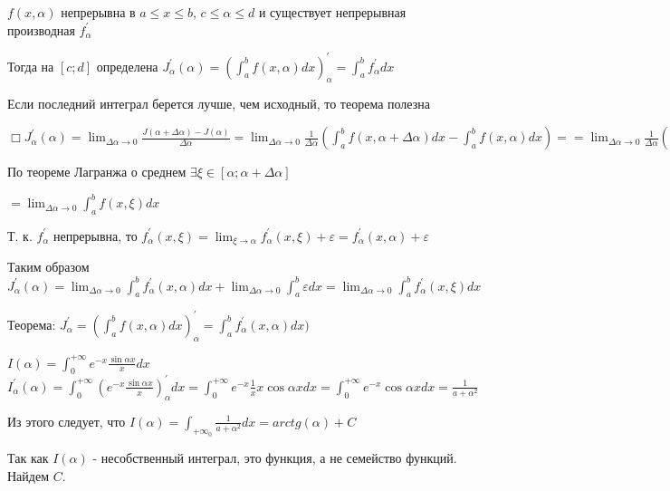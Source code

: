 \documentclass[12pt]{article}
\begin{document}
    $f(x, \alpha)$ непрерывна в $a \leq x \leq b$, $c \leq \alpha \leq d$ и существует непрерывная производная $f^\prime_\alpha$

    Тогда на $[c;d]$ определена $J^\prime_\alpha(\alpha) = \left(\int^b_a f(x, \alpha)dx\right)^\prime_\alpha = \int^b_a f^\prime_\alpha dx$

    Если последний интеграл берется лучше, чем исходный, то теорема полезна

    $\displaystyle \Box J^\prime_\alpha(\alpha) = \lim_{\Delta \alpha \to 0} \frac{J(\alpha + \Delta \alpha) - J(\alpha)}{\Delta \alpha} =
    \lim_{\Delta \alpha \to 0} \frac{1}{\Delta \alpha} \left(\int^b_a f(x, \alpha + \Delta \alpha)dx - \int^b_a f(x, \alpha)dx\right) =
    = \lim_{\Delta \alpha \to 0} \frac{1}{\Delta \alpha} \left(\int^b_a (f(x, \alpha + \Delta \alpha) - f(x, \alpha))dx\right)$

    По теореме Лагранжа о среднем $\exists \xi \in [\alpha; \alpha + \Delta \alpha]$

    $\displaystyle = \lim_{\Delta \alpha \to 0} \int^b_a f(x, \xi)dx$

    Т. к. $f^\prime_\alpha$ непрерывна, то $\displaystyle f^\prime_\alpha (x, \xi) = \lim_{\xi \to \alpha} f^\prime_\alpha (x, \xi) + \varepsilon = f^\prime_\alpha (x, \alpha) + \varepsilon$

    Таким образом $\displaystyle J^\prime_\alpha(\alpha) = \lim_{\Delta \alpha \to 0} \int^{b}_{a} f^\prime_{\alpha}(x, \alpha) dx + \lim_{\Delta \alpha \to 0} \int^{b}_{a} \varepsilon dx =
    \lim_{\Delta \alpha \to 0} \int^{b}_{a} f^\prime_{\alpha}(x, \xi) dx$



    Теорема: $\displaystyle J^\prime_\alpha = \left(\int^b_a f(x, \alpha)dx\right)^\prime_\alpha = \int^b_a f^\prime_\alpha(x, \alpha)dx)$

    \Ex

    $\displaystyle I(\alpha) = \int^{+\infty}_0 e^{-x} \frac{\sin\alpha x}{x}dx$
    $\displaystyle I^\prime_\alpha(\alpha) = \int^{+\infty}_0 \left(e^{-x} \frac{\sin\alpha x}{x}\right)^\prime_\alpha dx = \int^{+\infty}_0 e^{-x} \frac{1}{x} x \cos\alpha x dx =
    \int^{+\infty}_0 e^{-x} \cos\alpha x dx = \frac{1}{a + \alpha^2}$

    Из этого следует, что $\displaystyle I(\alpha) = \int_{+\infty}_{0} \frac{1}{a + \alpha^2} dx = arctg(\alpha) + C$

    Так как $I(\alpha)$ - несобственный интеграл, это функция, а не семейство функций. Найдем $C$.
\end{document}
